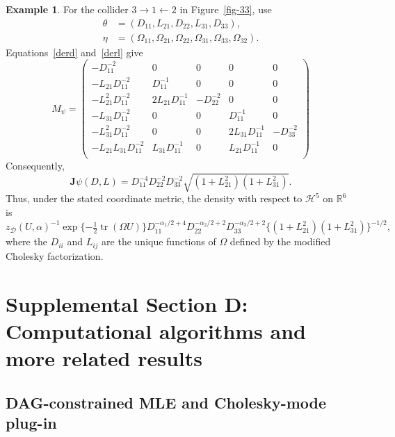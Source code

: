 \documentclass[12pt]{article}
\DeclareMathOperator{\tr}{tr}
\newcommand{\D}{\mathcal{D}}
\theoremstyle{plain}
\theoremstyle{definition}
\newtheorem{Ex}[theorem]{Example}
\theoremstyle{remark}
\begin{document}

\begin{Ex}
For the collider $3\to1\leftarrow2$ in Figure~\ref{fig-33}, use
\[
\begin{aligned}
\theta&=(D_{11},L_{21},D_{22},L_{31},D_{33}),\\
\eta&=(\Omega_{11},\Omega_{21},\Omega_{22},
       \Omega_{31},\Omega_{33},\Omega_{32}).
\end{aligned}
\]
Equations~\eqref{derd} and~\eqref{derl} give
\[
M_{\psi}=
\left(
\begin{matrix}
       -D_{11}^{-2}&  0&      0&         0&      0\\
	    -L_{21}D_{11}^{-2}&       D_{11}^{-1}&      0&         0&      0\\
  -L_{21}^2D_{11}^{-2}& 2L_{21}D_{11}^{-1}& -D_{22}^{-2}&         0&   0\\
  -L_{31}D_{11}^{-2}&         0&      0&       D_{11}^{-1} &     0\\
	   -L_{31}^2D_{11}^{-2}&         0&      0& 2L_{31}D_{11}^{-1}& -D_{33}^{-2}\\
-L_{21}L_{31}D_{11}^{-2}&   L_{31}D_{11}^{-1}&      0&   L_{21}D_{11}^{-1}& 0\\
\end{matrix}
\right)
\]
Consequently,
\[
\mathbf{J}\psi(D,L)=D_{11}^{-4}D_{22}^{-2}D_{33}^{-2}
\sqrt{(1+L_{21}^{2})(1+L_{31}^{2})}.
\]
Thus, under the stated coordinate metric, the density with respect to
$\mathcal{H}^{5}$ on $\mathbb{R}^{6}$ is
\[
z_{\D}(U,\alpha)^{-1}\exp\{-\tfrac{1}{2}\tr(\Omega U)\}
D_{11}^{-\alpha_1/2+4}D_{22}^{-\alpha_2/2+2}D_{33}^{-\alpha_3/2+2}
\{(1+L_{21}^{2})(1+L_{31}^{2})\}^{-1/2},
\]
where the $D_{ii}$ and $L_{ij}$ are the unique functions of $\Omega$
defined by the modified Cholesky factorization.
\end{Ex}


\section*{Supplemental Section D: Computational algorithms and more related results}

\subsection*{DAG-constrained MLE and Cholesky-mode plug-in}
\label{sec:suppAlgo}
\end{document}
